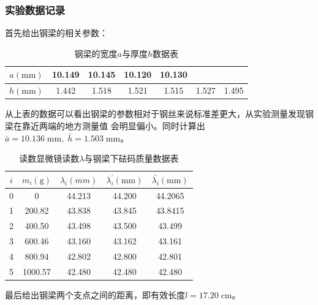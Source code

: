 \documentclass[a4paper]{ctexart}
\def\mm{\mathrm{mm}}
\def\cm{\mathrm{cm}}
\def\g{\mathrm{g}}
\begin{document}
	\subsubsection{实验数据记录}
	\par 
	首先给出钢梁的相关参数：
	\begin{table}[htbp]
		\centering
		\caption{钢梁的宽度$a$与厚度$h$数据表}
		\begin{tabular}{ccccccc}
			\toprule[1.5pt]
			$a(\mm)$ & 10.149 & 10.145 & 10.120 & 10.130 & & \\
			\midrule
			$h(\mm)$ & 1.442 & 1.518 & 1.521 & 1.515 & 1.527 & 1.495\\
			\bottomrule[1.5pt]
		\end{tabular}
	\end{table}
	\par 
	从上表的数据可以看出钢梁的参数相对于钢丝来说标准差更大，从实验测量发现钢梁在靠近两端的地方测量值
	会明显偏小。同时计算出$\bar{a} = 10.136\;\mm,\;\bar{h}=1.503\;\mm$。
	\begin{table}[htbp]
		\centering
		\caption{读数显微镜读数$\lambda$与钢梁下砝码质量数据表}
		\begin{tabular}{ccccc}
			\toprule[1.5pt]
			$i$ & $m_{i}(\g)$ & $\lambda_{i}(mm)$ & $\lambda_{i}^{'}(\mm)$ & $\bar{\lambda_{i}}(\mm)$\\
			\midrule
			0 & 0      & 44.213 & 44.200 & 44.2065\\
			1 & 200.82 & 43.838 & 43.845 & 43.8415\\
			2 & 400.50 & 43.498 & 43.500 & 43.499 \\
			3 & 600.46 & 43.160 & 43.162 & 43.161 \\
			4 & 800.94 & 42.802 & 42.800 & 42.801 \\
			5 & 1000.57& 42.480 & 42.480 & 42.480 \\
			\bottomrule[1.5pt]
		\end{tabular}
	\end{table}
	\par 
	最后给出钢梁两个支点之间的距离，即有效长度$l=17.20\;\cm$。
\end{document}
